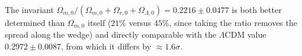 \documentclass[11pt]{article}
\newcommand{\Om}{\Omega_{m,0}}
\newcommand{\Or}{\Omega_{r,0}}
\newcommand{\OL}{\Omega_{\Lambda,0}}
\begin{document}
\noindent The invariant $\Om/(\Om{+}\Or{+}\OL) = 0.2216\pm0.0477$ is both
better determined than $\Om$ itself ($21\%$ versus $45\%$, since taking the
ratio removes the spread along the wedge) and directly comparable with the
$\Lambda$CDM value $0.2972\pm0.0087$, from which it differs by
$\approx1.6\sigma$.
\end{document}
